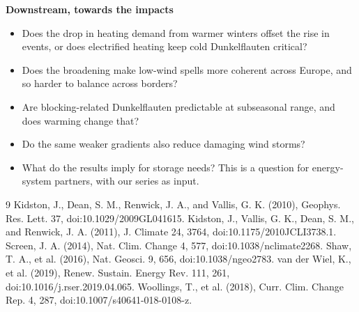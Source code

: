 \documentclass[10pt,a4paper]{article}
\begin{document}
\textbf{Downstream, towards the impacts}
\begin{itemize}
\item Does the drop in heating demand from warmer winters offset the rise in events, or does electrified heating
      keep cold Dunkelflauten critical?
\item Does the broadening make low-wind spells more coherent across Europe, and so harder to balance across borders?
\item Are blocking-related Dunkelflauten predictable at subseasonal range, and does warming change that?
\item Do the same weaker gradients also reduce damaging wind storms?
\item What do the results imply for storage needs? This is a question for energy-system partners, with our series as
      input.
\end{itemize}

{\small
\begin{thebibliography}{9}\setlength{\itemsep}{0pt}
 Kidston, J., Dean, S. M., Renwick, J. A., and Vallis, G. K. (2010), Geophys. Res. Lett. 37, doi:10.1029/2009GL041615.
 Kidston, J., Vallis, G. K., Dean, S. M., and Renwick, J. A. (2011), J. Climate 24, 3764, doi:10.1175/2010JCLI3738.1.
 Screen, J. A. (2014), Nat. Clim. Change 4, 577, doi:10.1038/nclimate2268.
 Shaw, T. A., et al. (2016), Nat. Geosci. 9, 656, doi:10.1038/ngeo2783.
 van der Wiel, K., et al. (2019), Renew. Sustain. Energy Rev. 111, 261, doi:10.1016/j.rser.2019.04.065.
 Woollings, T., et al. (2018), Curr. Clim. Change Rep. 4, 287, doi:10.1007/s40641-018-0108-z.
\end{thebibliography}}
\end{document}
